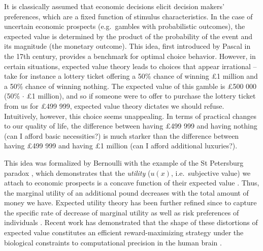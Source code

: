 \documentclass[a4paper, nobind]{templates/ociamthesis}
\begin{document}
It is classically assumed that economic decisions elicit decision makers' preferences, which are a fixed function of stimulus characteristics. In the case of uncertain economic prospects (e.g.~gambles with probabilistic outcomes), the expected value is determined by the product of the probability of the event and its magnitude (the monetary outcome). This idea, first introduced by Pascal in the 17th century, provides a benchmark for optimal choice behavior. However, in certain situations, expected value theory leads to choices that appear irrational -- take for instance a lottery ticket offering a 50\% chance of winning £1 million and a 50\% chance of winning nothing. The expected value of this gamble is £500 000 (50\% \(\cdot\) £1 million), and so if someone were to offer to purchase the lottery ticket from us for £499 999, expected value theory dictates we should refuse. Intuitively, however, this choice seems unappealing. In terms of practical changes to our quality of life, the difference between having £499 999 and having nothing (can I afford basic necessities?) is much starker than the difference between having £499 999 and having £1 million (can I afford additional luxuries?).

This idea was formalized by Bernoulli with the example of the St Petersburg paradox \autocite[another hypothetical gamble,][]{dutka1988}, which demonstrates that the \emph{utility} (\(u(x)\), i.e.~subjective value) we attach to economic prospects is a concave function of their expected value \autocite[e.g.~the von Neumann-Morgenstern utility function,][]{vonneumann1944}. Thus, the marginal utility of an additional pound decreases with the total amount of money we have. Expected utility theory has been further refined since to capture the specific rate of decrease of marginal utility as well as risk preferences of individuals \autocite[e.g.~Prospect theory,][]{kahneman1979}. Recent work has demonstrated that the shape of these distortions of expected value constitutes an efficient reward-maximizing strategy under the biological constraints to computational precision in the human brain \autocite{juechems2021}.
\end{document}
